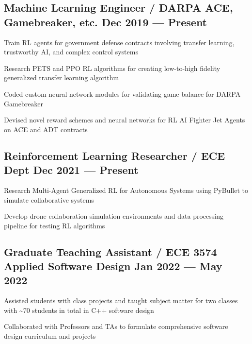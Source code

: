 \subsection{{Machine Learning Engineer / DARPA ACE, Gamebreaker, etc. \hfill Dec 2019 --- Present}}
\begin{zitemize}
	\item Train RL agents for government defense contracts involving transfer learning, trustworthy AI, and complex
	control systems
	\item Research PETS and PPO RL algorithms for creating low-to-high fidelity generalized transfer learning algorithm
	\item Coded custom neural network modules for validating game balance for DARPA Gamebreaker
	\item Devised novel reward schemes and neural networks for RL AI Fighter Jet Agents on ACE and ADT contracts
\end{zitemize}

\subsection{{Reinforcement Learning Researcher / ECE Dept  \hfill Dec 2021 --- Present}}
\begin{zitemize}
	\item Research Multi-Agent Generalized RL for Autonomous Systems using PyBullet to simulate
	collaborative systems
	\item Develop drone collaboration simulation environments and data processing pipeline for testing RL algorithms
\end{zitemize}

\subsection{{Graduate Teaching Assistant / ECE 3574 Applied Software Design  \hfill Jan 2022 --- May 2022}}
\begin{zitemize}
	\item Assisted students with class projects and taught subject matter for two classes with \textasciitilde 70 students in
	total in C++ software design
	\item Collaborated with Professors and TAs to formulate comprehensive software design curriculum and projects
\end{zitemize}

